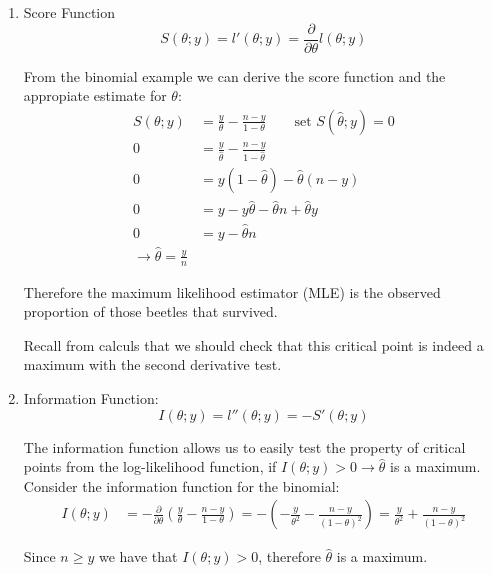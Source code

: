 \documentclass[english,12pt]{article}
\theoremstyle{plain}
\theoremstyle{definition}
\theoremstyle{definition} %
\begin{document}
{\begin{enumerate}
Take for example the log likelihood of the binomial distribution:
\begin{align*}
L(\theta;y)
&=cP(Y=y;\theta)\\
&=c{n\choose y} \theta^y(1-\theta)^{n-y} \qquad \text{let }c=\frac{1}{{n\choose y}}\\
&=\theta^y(1-\theta)^{n-y}\\
l(\theta;y)&=\ln(L(\theta;y))
=\ln(\theta^y(1-\theta)^{n-y})
=y\ln(\theta)+\frac{n-y}{\ln(1-\theta)}
\end{align*}

Maximizing $l(\theta;y)$ is our goal, so we differentiate with respect to $\theta$ and set the derivative equal to 0.

\item Score Function
\[S(\theta;y)=l'(\theta;y)=\frac{\partial}{\partial\theta}l(\theta;y)\]

From the binomial example we can derive the score function and the appropiate estimate for $\theta$:
\begin{align*}
S(\theta;y)&=\frac{y}{\theta} -\frac{n-y}{1-\theta} \qquad \text{set }S(\hat\theta; y)=0\\
0&=\frac{y}{\hat\theta} -\frac{n-y}{1-\hat\theta}\\
0&=y(1-\hat\theta)-\hat\theta(n-y)\\
0&= y-y\hat\theta-\hat\theta n+\hat\theta y\\
0&=y-\hat\theta n\\
\rightarrow \hat\theta=\frac{y}{n}
\end{align*}

Therefore the maximum likelihood estimator (MLE) is the observed proportion of those beetles that survived.

Recall from calculs that we should check that this critical point is indeed a maximum with the second derivative test.

\item Information Function:
\[I(\theta;y)=l''(\theta;y)=-S'(\theta;y)\]

The information function allows us to easily test the property of critical points from the log-likelihood function, if $I(\theta;y)>0\rightarrow \hat\theta$ is a maximum.  Consider the information function for the binomial:
\begin{align*}
I(\theta;y)&=-\frac{\partial}{\partial \theta}\left(\frac{y}{\theta}-\frac{n-y}{1-\theta}\right)
=-\left(-\frac{y}{\theta^2}-\frac{n-y}{(1-\theta)^2}\right)
=\frac{y}{\theta^2}+\frac{n-y}{(1-\theta)^2}
\end{align*}

Since $n\ge y$ we have that $I(\theta;y)>0$, therefore $\hat\theta$ is a maximum.
\end{enumerate}
}
\end{document}
